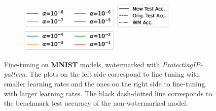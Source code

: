 \begin{figure}
     \begin{subfigure}[b]{\textwidth}
         \centering
         \includegraphics[height=1.1cm]{images/finetuning/legend_content_finetuning_smalllr_colors.eps}
         \quad
         \includegraphics[height=1.3cm]{images/finetuning/legend_content_finetuning_linetypes.eps}
         \quad
         \includegraphics[height=1.1cm]{images/finetuning/legend_content_finetuning_largelr_colors.eps}
     \end{subfigure}
     
     \caption{Fine-tuning on \textbf{MNIST} models, watermarked with \textit{ProtectingIP-pattern}. The plots on the left side correspond to fine-tuning with smaller learning rates and the ones on the right side to fine-tuning with larger learning rates. The black dash-dotted line corresponds to the benchmark test accuracy of the non-watermarked model.}
     \label{fig:finetuning_mnistmodels}
\end{figure}


